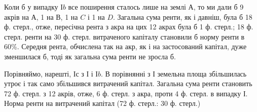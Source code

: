 Коли б у випадку І$b$ все поширення сталось лише на землі $А$, то ми
дали б 9 акрів на $А$, 1 на $В$, 1 на $C$ і 1 на $D$. Загальна сума ренти, як і давніш,
була б 18 ф. стерл., отже, пересічна рента з акра на цих 12 акрах
була б 1 ф. стерл.; 18 ф. стерл. ренти на 30 ф. стерл. витраченого капіталу
становили б норму ренти в 60\%. Середня рента, обчислена так на акр,
як і на застосований капітал, дуже зменшилася б, тоді як загальна сума ренти
не зросла б.

Порівняймо, нарешті, І$с$ з І і І$b$. В порівнянні з І земельна площа збільшилась
утроє і так само збільшився витрачений капітал. Загальна сума ренти
становить 72 ф. стерл. з 12 акрів, отже, 6 ф. стерл. з акра, проти 4 ф.
стерл. в випадку І. Норма ренти на витрачений капітал (72 ф. стерл.: 30 ф. стерл.)
\parbreak{}  %
